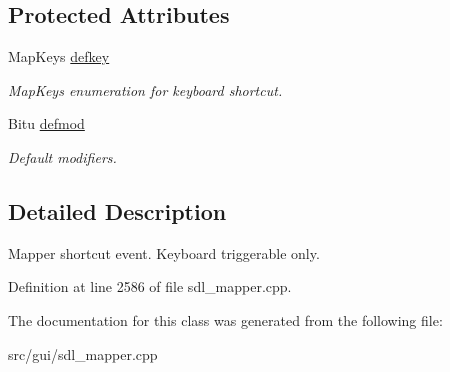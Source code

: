 \subsection*{Protected Attributes}
\begin{DoxyCompactItemize}
\item 
\hypertarget{classCHandlerEvent_a7d53624253497b7dcad4a281a790333d}{Map\-Keys \hyperlink{classCHandlerEvent_a7d53624253497b7dcad4a281a790333d}{defkey}}\label{classCHandlerEvent_a7d53624253497b7dcad4a281a790333d}

\begin{DoxyCompactList}\small\item\em Map\-Keys enumeration for keyboard shortcut. \end{DoxyCompactList}\item 
\hypertarget{classCHandlerEvent_a2ebc8142a6ef34d7c23349e86a0d4486}{Bitu \hyperlink{classCHandlerEvent_a2ebc8142a6ef34d7c23349e86a0d4486}{defmod}}\label{classCHandlerEvent_a2ebc8142a6ef34d7c23349e86a0d4486}

\begin{DoxyCompactList}\small\item\em Default modifiers. \end{DoxyCompactList}\end{DoxyCompactItemize}


\subsection{Detailed Description}
Mapper shortcut event. Keyboard triggerable only. 

Definition at line 2586 of file sdl\-\_\-mapper.\-cpp.



The documentation for this class was generated from the following file\-:\begin{DoxyCompactItemize}
\item 
src/gui/sdl\-\_\-mapper.\-cpp\end{DoxyCompactItemize}
